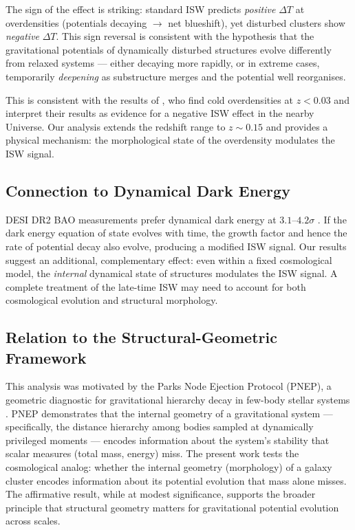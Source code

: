 \documentclass[twocolumn]{article}
\begin{document}
The sign of the effect is striking: standard ISW predicts
\emph{positive} $\Delta T$ at overdensities (potentials decaying
$\to$ net blueshift), yet disturbed clusters show \emph{negative}
$\Delta T$.
This sign reversal is consistent with the hypothesis that
the gravitational potentials of dynamically disturbed structures
evolve differently from relaxed systems --- either decaying more
rapidly, or in extreme cases, temporarily \emph{deepening} as
substructure merges and the potential well reorganises.

This is consistent with the results of \citet{hansen2026}, who
find cold overdensities at $z < 0.03$ and interpret their results
as evidence for a negative ISW effect in the nearby Universe.
Our analysis extends the redshift range to $z \sim 0.15$ and
provides a physical mechanism: the morphological state of the
overdensity modulates the ISW signal.

\subsection{Connection to Dynamical Dark Energy}

DESI DR2 BAO measurements prefer dynamical dark energy at
$3.1$--$4.2\sigma$ \citep{desi2025}.
If the dark energy equation of state evolves with time,
the growth factor and hence the rate of potential decay also
evolve, producing a modified ISW signal.
Our results suggest an additional, complementary effect: even
within a fixed cosmological model, the \emph{internal} dynamical
state of structures modulates the ISW signal.
A complete treatment of the late-time ISW may need to account
for both cosmological evolution and structural morphology.

\subsection{Relation to the Structural-Geometric Framework}

This analysis was motivated by the Parks Node Ejection Protocol
(PNEP), a geometric diagnostic for gravitational hierarchy decay
in few-body stellar systems \citep{parks2026}.
PNEP demonstrates that the internal geometry of a gravitational
system --- specifically, the distance hierarchy among bodies
sampled at dynamically privileged moments --- encodes information
about the system's stability that scalar measures (total mass,
energy) miss.
The present work tests the cosmological analog: whether the
internal geometry (morphology) of a galaxy cluster encodes
information about its potential evolution that mass alone misses.
The affirmative result, while at modest significance, supports the
broader principle that structural geometry matters for
gravitational potential evolution across scales.
\end{document}
